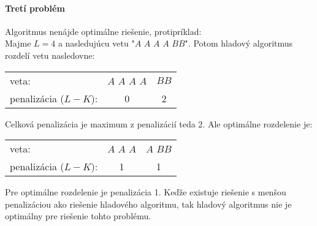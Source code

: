 \documentclass[12pt]{iv003}
\begin{document}
\paragraph{Tretí problém}Algoritmus nenájde optimálne riešenie, protipríklad:\\
Majme $L = 4$ a nasledujúcu vetu "$A$ $A$ $A$ $A$ $BB$".
Potom hladový algoritmus rozdelí vetu nasledovne:
\begin{center}
\begin{tabular}{lc|c}
	veta: 					& $A$ $A$ $A$ $A$ 	& $BB$  \\
	penalizácia ($L - K$):	&	0				&	2	\\
\end{tabular}
\end{center}
Celková penalizácia je maximum z penalizácií teda 2.
Ale optimálne rozdelenie je:
\begin{center}
\begin{tabular}{lc|c}
	veta: 					& $A$ $A$ $A$  	& $A$ $BB$ \\
	penalizácia ($L - K$):	&	1			&	1	\\
\end{tabular}
\end{center}
Pre optimálne rozdelenie je penalizácia 1. Keďže existuje riešenie s menšou penalizáciou ako riešenie hladového algoritmu, tak hladový algoritmus nie je optimálny pre riešenie tohto problému.
\end{document}
